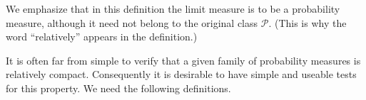 We emphasize that in this definition the limit measure is to be a probability measure, although it need not belong to the original class $\mathcal{P}$. (This is why the word “relatively” appears in the definition.)

It is often far from simple to verify that a given family of probability measures is relatively compact. Consequently it is desirable to have simple and useable tests for this property. We need the following definitions.
